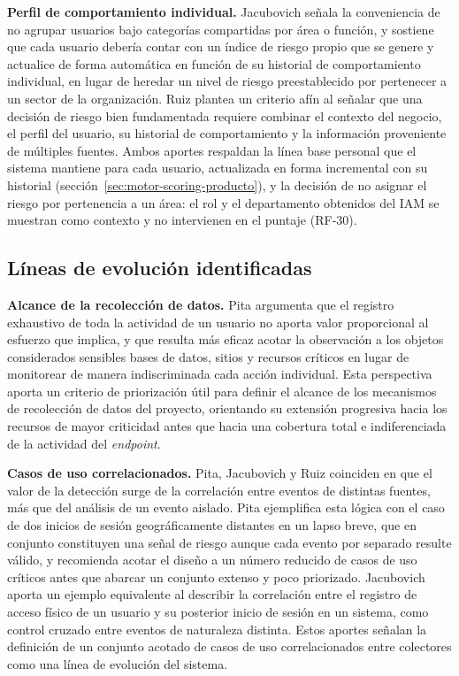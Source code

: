 \textbf{Perfil de comportamiento individual.} Jacubovich señala la conveniencia de no agrupar usuarios bajo categorías compartidas por área o función, y sostiene que cada usuario debería contar con un índice de riesgo propio que se genere y actualice de forma automática en función de su historial de comportamiento individual, en lugar de heredar un nivel de riesgo preestablecido por pertenecer a un sector de la organización. Ruiz plantea un criterio afín al señalar que una decisión de riesgo bien fundamentada requiere combinar el contexto del negocio, el perfil del usuario, su historial de comportamiento y la información proveniente de múltiples fuentes. Ambos aportes respaldan la línea base personal que el sistema mantiene para cada usuario, actualizada en forma incremental con su historial (sección~\ref{sec:motor-scoring-producto}), y la decisión de no asignar el riesgo por pertenencia a un área: el rol y el departamento obtenidos del IAM se muestran como contexto y no intervienen en el puntaje (RF-30).

\subsection{Líneas de evolución identificadas}
\textbf{Alcance de la recolección de datos.} Pita argumenta que el registro exhaustivo de toda la actividad de un usuario no aporta valor proporcional al esfuerzo que implica, y que resulta más eficaz acotar la observación a los objetos considerados sensibles bases de datos, sitios y recursos críticos en lugar de monitorear de manera indiscriminada cada acción individual. Esta perspectiva aporta un criterio de priorización útil para definir el alcance de los mecanismos de recolección de datos del proyecto, orientando su extensión progresiva hacia los recursos de mayor criticidad antes que hacia una cobertura total e indiferenciada de la actividad del \emph{endpoint}.

\textbf{Casos de uso correlacionados.} Pita, Jacubovich y Ruiz coinciden en que el valor de la detección surge de la correlación entre eventos de distintas fuentes, más que del análisis de un evento aislado. Pita ejemplifica esta lógica con el caso de dos inicios de sesión geográficamente distantes en un lapso breve, que en conjunto constituyen una señal de riesgo aunque cada evento por separado resulte válido, y recomienda acotar el diseño a un número reducido de casos de uso críticos antes que abarcar un conjunto extenso y poco priorizado. Jacubovich aporta un ejemplo equivalente al describir la correlación entre el registro de acceso físico de un usuario y su posterior inicio de sesión en un sistema, como control cruzado entre eventos de naturaleza distinta. Estos aportes señalan la definición de un conjunto acotado de casos de uso correlacionados entre colectores como una línea de evolución del sistema.

